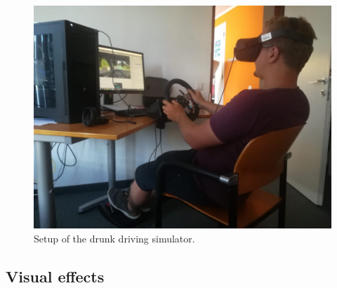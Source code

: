 \begin{figure}[h]
    \centering
	\includegraphics[width=1\linewidth]{images/studySetup.jpeg}
	\caption[
		Simulator setup
	]{
		Setup of the drunk driving simulator.
	}
	\label{figure:overviewEnvironment}
\end{figure}

\subsection{Visual effects}
\label{subsection:visual effects}

